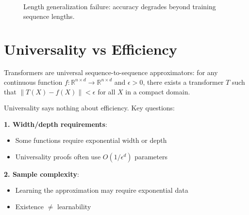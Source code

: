 \begin{figure}[h]
\centering
\caption{Length generalization failure: accuracy degrades beyond training sequence lengths.}
\end{figure}

\section{Universality vs Efficiency}

\begin{theorem}
    Transformers are universal sequence-to-sequence approximators: for any continuous function $f: \mathbb{R}^{n \times d} \to \mathbb{R}^{n \times d}$ and $\epsilon > 0$, there exists a transformer $T$ such that $\|T(X) - f(X)\| < \epsilon$ for all $X$ in a compact domain.
\end{theorem}

\begin{remark}
    Universality says nothing about efficiency. Key questions:

    \textbf{1. Width/depth requirements}:
    \begin{itemize}
        \item Some functions require exponential width or depth
        \item Universality proofs often use $O(1/\epsilon^d)$ parameters
    \end{itemize}

    \textbf{2. Sample complexity}:
    \begin{itemize}
        \item Learning the approximation may require exponential data
        \item Existence $\neq$ learnability
    \end{itemize}
\end{remark}


